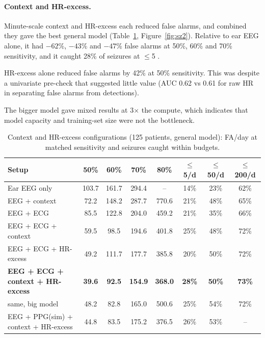 \paragraph{Context and HR-excess.} Minute-scale context and HR-excess each reduced false alarms, and combined they gave the best general model (Table~\ref{tab:ctx}, Figure~\ref{fig:sz2}). Relative to ear EEG alone, it had $-62$\%, $-43$\% and $-47$\% false alarms at 50\%, 60\% and 70\% sensitivity, and it caught 28\% of seizures at $\le$5 \FAd.

HR-excess alone reduced false alarms by 42\% at 50\% sensitivity. This was despite a univariate pre-check that suggested little value (AUC 0.62 vs 0.61 for raw HR in separating false alarms from detections).

The bigger model gave mixed results at 3$\times$ the compute, which indicates that model capacity and training-set size were not the bottleneck.

\begin{table}[htbp]
\centering\small
\caption{Context and HR-excess configurations (125 patients, general model): FA/day at matched sensitivity and seizures caught within budgets.}
\label{tab:ctx}
\setlength{\tabcolsep}{4.5pt}
\begin{tabular}{@{}lccccccc@{}}
\toprule
Setup & 50\% & 60\% & 70\% & 80\% & $\le$5/d & $\le$50/d & $\le$200/d \\
\midrule
Ear EEG only & 103.7 & 161.7 & 294.4 & -- & 14\% & 23\% & 62\% \\
EEG + context & 72.2 & 148.2 & 287.7 & 770.6 & 21\% & 48\% & 65\% \\
EEG + ECG & 85.5 & 122.8 & 204.0 & 459.2 & 21\% & 35\% & 66\% \\
EEG + ECG + context & 59.5 & 98.5 & 194.6 & 401.8 & 25\% & 48\% & 72\% \\
EEG + ECG + HR-excess & 49.2 & 111.7 & 177.7 & 385.8 & 20\% & 50\% & 72\% \\
\textbf{EEG + ECG + context + HR-excess} & \textbf{39.6} & \textbf{92.5} & \textbf{154.9} & \textbf{368.0} & \textbf{28\%} & \textbf{50\%} & \textbf{73\%} \\
same, big model & 48.2 & 82.8 & 165.0 & 500.6 & 25\% & 54\% & 72\% \\
EEG + PPG(sim) + context + HR-excess & 44.8 & 83.5 & 175.2 & 376.5 & 26\% & 53\% & -- \\
\bottomrule
\end{tabular}
\end{table}

